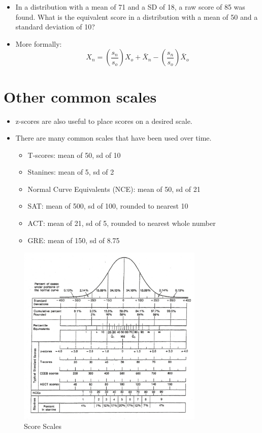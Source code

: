 \documentclass[12pt]{article}
\begin{document}
\begin{itemize}
\item
  In a distribution with a mean of 71 and a SD of 18, a raw score of 85
  was found. What is the equivalent score in a distribution with a mean
  of 50 and a standard deviation of 10?
\item
  More formally:
  \[ X_{n} = \left(\frac{s_{n}}{s_{o}} \right) X_{o} + \bar{X}_{n} - \left(\frac{s_{n}}{s_{o}} \right) \bar{X}_{o} \]
\end{itemize}

\section{Other common scales}\label{other-common-scales}

\begin{itemize}
\itemsep1pt\parskip0pt
\item
  z-scores are also useful to place scores on a desired scale.
\item
  There are many common scales that have been used over time.

  \begin{itemize}
  \itemsep1pt\parskip0pt
  \item
    T-scores: mean of 50, sd of 10
  \item
    Stanines: mean of 5, sd of 2
  \item
    Normal Curve Equivalents (NCE): mean of 50, sd of 21
  \item
    SAT: mean of 500, sd of 100, rounded to nearest 10
  \item
    ACT: mean of 21, sd of 5, rounded to nearest whole number
  \item
    GRE: mean of 150, sd of 8.75
  \end{itemize}
\end{itemize}

\begin{figure}[H]
\centering
\includegraphics[width=3.5in]{standardscores.png}
\caption{Score Scales}
\end{figure}
\end{document}
